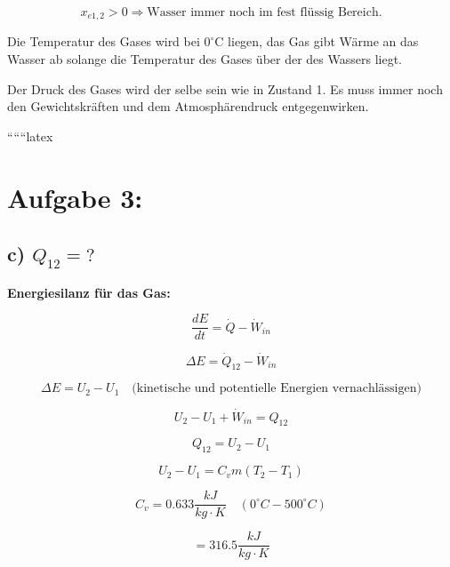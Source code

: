 \[
x_{e1,2} > 0 \Rightarrow \text{Wasser immer noch im fest flüssig Bereich.}
\]

Die Temperatur des Gases wird bei \(0^\circ \text{C}\) liegen, das Gas gibt Wärme an das Wasser ab solange die Temperatur des Gases über der des Wassers liegt.

Der Druck des Gases wird der selbe sein wie in Zustand 1. Es muss immer noch den Gewichtskräften und dem Atmosphärendruck entgegenwirken.

``````latex


\section*{Aufgabe 3:}

\subsection*{c) $Q_{12} = ?$}

\textbf{Energiesilanz für das Gas:}

\begin{equation*}
\frac{dE}{dt} = \dot{Q} - \dot{W}_{in}
\end{equation*}

\begin{equation*}
\Delta E = \dot{Q}_{12} - \dot{W}_{in}
\end{equation*}

\begin{equation*}
\Delta E = U_2 - U_1 \quad \text{(kinetische und potentielle Energien vernachlässigen)}
\end{equation*}

\begin{equation*}
U_2 - U_1 + \dot{W}_{in} = Q_{12}
\end{equation*}

\begin{equation*}
Q_{12} = U_2 - U_1
\end{equation*}

\begin{equation*}
U_2 - U_1 = C_v m (T_2 - T_1)
\end{equation*}

\begin{equation*}
C_v = 0.633 \frac{kJ}{kg \cdot K} \quad (0^\circ C - 500^\circ C)
\end{equation*}

\begin{equation*}
= 316.5 \frac{kJ}{kg \cdot K}
\end{equation*}

